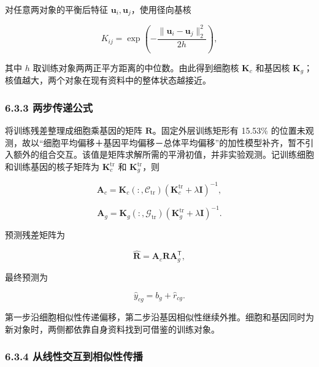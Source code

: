 对任意两对象的平衡后特征 \(\boldsymbol u_i,\boldsymbol u_j\)，使用径向基核

\begin{equation}
\label{eq:rbf-kernel}
K_{ij}=\exp\left(-\frac{\lVert\boldsymbol u_i-\boldsymbol u_j\rVert_2^2}{2h}\right),
\end{equation}

其中 \(h\) 取训练对象两两正平方距离的中位数。由此得到细胞核 \(\boldsymbol K_c\) 和基因核 \(\boldsymbol K_g\)；核值越大，两个对象在现有资料中的整体状态越接近。

\hypertarget{633-ux4e24ux6b65ux4f20ux9012ux516cux5f0f}{%
\subsubsection{6.3.3 两步传递公式}\label{633-ux4e24ux6b65ux4f20ux9012ux516cux5f0f}}

将训练残差整理成细胞乘基因的矩阵 \(\boldsymbol R\)。固定外层训练矩形有 15.53\% 的位置未观测，故以``细胞平均偏移＋基因平均偏移－总体平均偏移''的加性模型补齐，暂不引入额外的组合交互。该值是矩阵求解所需的平滑初值，并非实验观测。记训练细胞和训练基因的核子矩阵为 \(\boldsymbol K_c^{\mathrm{tr}}\) 和 \(\boldsymbol K_g^{\mathrm{tr}}\)，则

\[
\boldsymbol A_c=\boldsymbol K_c(:,\mathcal C_{\mathrm{tr}})
\left(\boldsymbol K_c^{\mathrm{tr}}+\lambda\boldsymbol I\right)^{-1},
\]

\[
\boldsymbol A_g=\boldsymbol K_g(:,\mathcal G_{\mathrm{tr}})
\left(\boldsymbol K_g^{\mathrm{tr}}+\lambda\boldsymbol I\right)^{-1}.
\]

预测残差矩阵为

\begin{equation}
\label{eq:two-step-residual}
\widehat{\boldsymbol R}=\boldsymbol A_c\boldsymbol R\boldsymbol A_g^{\mathsf T},
\end{equation}

最终预测为

\begin{equation}
\label{eq:final-prediction}
\widehat y_{cg}=b_g+\widehat r_{cg}.
\end{equation}

第一步沿细胞相似性传递偏移，第二步沿基因相似性继续外推。细胞和基因同时为新对象时，两侧都依靠自身资料找到可借鉴的训练对象。

\hypertarget{634-ux4eceux7ebfux6027ux4ea4ux4e92ux5230ux76f8ux4f3cux6027ux4f20ux64ad}{%
\subsubsection{6.3.4 从线性交互到相似性传播}\label{634-ux4eceux7ebfux6027ux4ea4ux4e92ux5230ux76f8ux4f3cux6027ux4f20ux64ad}}

